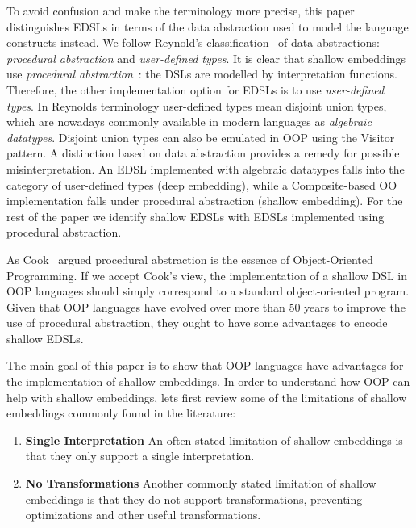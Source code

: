 To avoid confusion and make the terminology more precise,
this paper distinguishes EDSLs in terms of the data
abstraction used to model the language constructs instead.  We follow
Reynold's classification~\cite{} of data abstractions:
\emph{procedural abstraction} and \emph{user-defined types}. It is
clear that shallow embeddings use \emph{procedural
  abstraction}~\cite{}: the DSLs are modelled by interpretation
functions. Therefore, the other implementation option for EDSLs is to use
\emph{user-defined types}. In Reynolds terminology user-defined types
mean disjoint union types, which are nowadays commonly available in
modern languages as \emph{algebraic datatypes}. Disjoint union types 
can also be emulated in OOP using the {\sc Visitor} pattern. A
distinction based on data abstraction provides a remedy for possible
misinterpretation. An EDSL implemented with algebraic
datatypes falls into the category of user-defined types (deep embedding), 
while a Composite-based OO implementation falls under procedural
abstraction (shallow embedding). For the rest of the paper we identify shallow EDSLs 
with EDSLs implemented using procedural abstraction.

As Cook~\cite{} argued
procedural abstraction is the essence of Object-Oriented
Programming. If we accept Cook's view, the implementation of a shallow
DSL in OOP languages should simply correspond to a standard
object-oriented program. Given that OOP languages have
evolved over more than 50 years to improve the use of procedural
abstraction, they ought to have some advantages to encode shallow
EDSLs.

The main goal of this paper is to show that OOP languages have advantages for the
implementation of shallow embeddings.  
In order to understand how OOP can help with shallow embeddings, lets
first review some of the limitations of shallow embeddings commonly found in
the literature:

\begin{enumerate}

\item {\bf Single Interpretation} An often stated limitation of
  shallow embeddings is that they only support a single
  interpretation.

\item {\bf No Transformations} Another commonly stated limitation 
of shallow embeddings is that they do not support transformations,
preventing optimizations and other useful transformations.

\end{enumerate}

